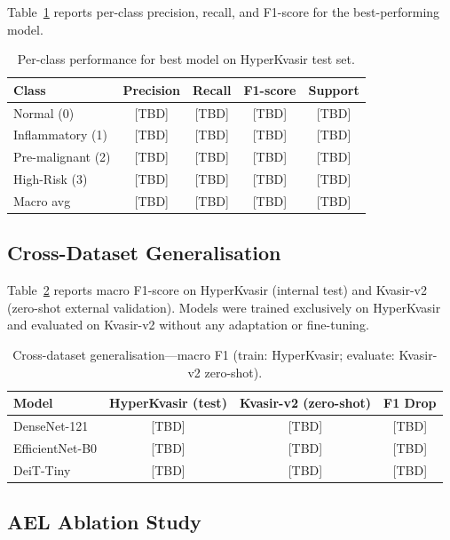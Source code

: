 \documentclass[10pt,a4paper,twocolumn]{article}
\begin{document}
Table~\ref{tab:per_class} reports per-class precision, recall, and F1-score
for the best-performing model.

\begin{table}[htbp]
\centering
\caption{Per-class performance for best model on HyperKvasir test set.}
\label{tab:per_class}
\begin{tabular}{lcccc}
\toprule
\textbf{Class} & \textbf{Precision} & \textbf{Recall} & \textbf{F1-score}
& \textbf{Support}\\
\midrule
Normal (0)        & [TBD] & [TBD] & [TBD] & [TBD]\\
Inflammatory (1)  & [TBD] & [TBD] & [TBD] & [TBD]\\
Pre-malignant (2) & [TBD] & [TBD] & [TBD] & [TBD]\\
High-Risk (3)     & [TBD] & [TBD] & [TBD] & [TBD]\\
Macro avg         & [TBD] & [TBD] & [TBD] & [TBD]\\
\bottomrule
\end{tabular}
\end{table}

\subsection{Cross-Dataset Generalisation}

Table~\ref{tab:xdataset} reports macro F1-score on HyperKvasir (internal
test) and Kvasir-v2 (zero-shot external validation). Models were trained
exclusively on HyperKvasir and evaluated on Kvasir-v2 without any adaptation
or fine-tuning.

\begin{table}[htbp]
\centering
\caption{Cross-dataset generalisation---macro F1 (train: HyperKvasir;
  evaluate: Kvasir-v2 zero-shot).}
\label{tab:xdataset}
\begin{tabular}{lccc}
\toprule
\textbf{Model} & \textbf{HyperKvasir (test)} &
\textbf{Kvasir-v2 (zero-shot)} & \textbf{F1 Drop}\\
\midrule
DenseNet-121    & [TBD] & [TBD] & [TBD]\\
EfficientNet-B0 & [TBD] & [TBD] & [TBD]\\
DeiT-Tiny       & [TBD] & [TBD] & [TBD]\\
\bottomrule
\end{tabular}
\end{table}

\subsection{AEL Ablation Study}
\end{document}
